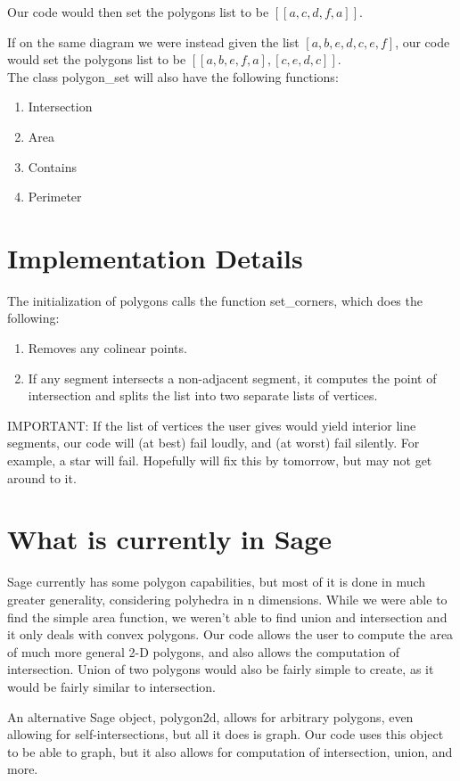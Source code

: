 \documentclass[11pt]{amsart}
\theoremstyle{definition}
\theoremstyle{remark}
\numberwithin{equation}{section}
\begin{document}
Our code would then set the polygons list to be $[[a,c,d,f,a]]$.

If on the same diagram we were instead given the list $[a,b,e,d,c,e,f]$, our code would set the polygons list to be 
$[[a,b,e,f,a], [c,e,d,c]]. $
\\
The class polygon\_set will also have the following functions:

\begin{enumerate}
\item{Intersection}
\item{Area}
\item{Contains}
\item{Perimeter}
\end{enumerate}


\section{Implementation Details}
The initialization of polygons calls the function set\_corners, which does the following:
\begin{enumerate}
\item{Removes any colinear points.}
\item{If any segment intersects a non-adjacent segment, it computes the point of intersection and splits the list into two separate lists of vertices.}

\end{enumerate}

IMPORTANT: If the list of vertices the user gives would yield interior line segments, our code will (at best) fail loudly, and (at worst) fail silently. For example, a star will fail. Hopefully will fix this by tomorrow, but may not get around to it.

\section{What is currently in Sage}
Sage currently has some polygon capabilities, but most of it is done in much greater generality, considering polyhedra in n dimensions. While we were able to find the simple area function, we weren't able to find union and intersection and it only deals with convex polygons. Our code allows the user to compute the area of much more general 2-D polygons, and also allows the computation of intersection. Union of two polygons would also be fairly simple to create, as it would be fairly similar to intersection.

An alternative Sage object, polygon2d, allows for arbitrary polygons, even allowing for self-intersections, but all it does is graph. Our code uses this object to be able to graph, but it also allows for computation of intersection, union, and more.
\end{document}
